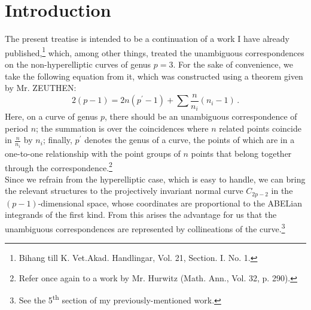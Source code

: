 \documentclass[leqno]{article}
\begin{document}
\section*{Introduction}
The present treatise is intended to be a continuation of a work I have already published,\footnote{Bihang till K. Vet.Akad. Handlingar, Vol. 21, Section. I. No. 1.} which, among other things, treated the unambiguous correspondences on the non-hyperelliptic curves of genus $p = 3$. 
For the sake of convenience, we take the following equation from it, which was constructed using a theorem given by Mr. ZEUTHEN:
\begin{equation}\label{eq: A}
2(p-1) = 2n(p^\prime-1) + \sum \frac{n}{n_i}(n_i-1) \, . \tag{A}
\end{equation}
Here, on a curve of genus $p$, there should be an unambiguous correspondence of period $n$; the summation is over the coincidences where $n$ related points coincide in $\frac{n}{n_i}$ by $n_i$; finally, $p^\prime$ denotes the genus of a curve, the points of which are in a one-to-one relationship with the point groups of $n$ points that belong together through the correspondence.\footnote{Refer once again to a work by Mr. Hurwitz (Math. Ann., Vol. 32, p. 290).} \\
Since we refrain from the hyperelliptic case, which is easy to handle, we can bring the relevant structures to the projectively invariant normal curve $C_{2p-2}$ in the $ (p-1) $-dimensional space, whose coordinates are proportional to the ABELian integrands of the first kind. From this arises the advantage for us that the unambiguous correspondences are represented by collineations of the curve.\footnote{See the 5\textsuperscript{th} section of my previously-mentioned work.}
\end{document}

